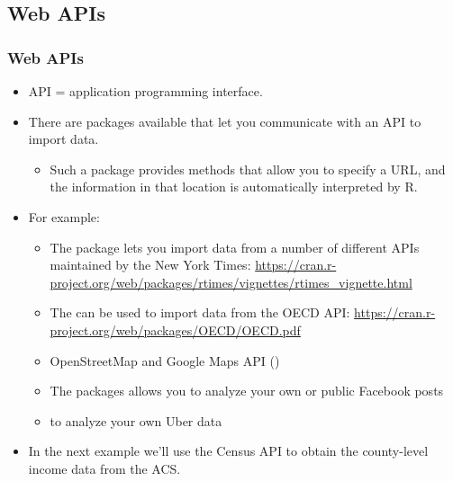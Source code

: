\documentclass{beamer}
\begin{document}
\subsection{Web APIs}

\begin{frame}[allowframebreaks]
 \frametitle{Web APIs}

	\begin{itemize}
	    \item
	    API = application programming interface.
	    \vfill
	    \item
	    There are packages available that let you communicate with an API to import data.
	    \begin{itemize}
	        \item
	        Such a package provides methods that allow you to specify a URL, and the information in that location is automatically interpreted by R.
	        \vfill
	    \end{itemize}
	    \item
	    For example:
	    \begin{itemize}
	        \item
	        The  package lets you import data from a number of different APIs maintained by the New York Times: \scriptsize\url{https://cran.r-project.org/web/packages/rtimes/vignettes/rtimes_vignette.html}\small
	        \item
	        The  can be used to import data from the OECD API: \scriptsize\url{https://cran.r-project.org/web/packages/OECD/OECD.pdf}\small
	        \item
	        OpenStreetMap and Google Maps API ()
	        \item
	        The  packages allows you to analyze your own or public Facebook posts
	        \item
	         to analyze your own Uber data
	        \vfill
	    \end{itemize}
	    \vskip-1.4cm
	    \item
	    In the next example we'll use the Census API to obtain the county-level income data from the ACS.
	\end{itemize}


\end{frame}
\end{document}

